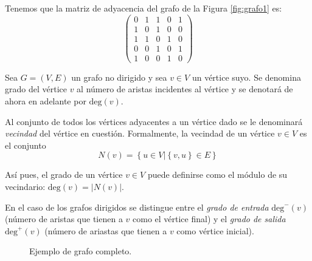 \begin{exampleth}
Tenemos que la matriz de adyacencia del grafo de la Figura \ref{fig:grafo1} es:
\begin{equation}
\begin{pmatrix}
0 & 1 & 1 & 0 & 1\\
1 & 0 & 1 & 0 & 0\\
1 & 1 & 0 & 1 & 0\\
0 & 0 & 1 & 0 & 1\\
1 & 0 & 0 & 1 & 0
\end{pmatrix}
\end{equation}
\end{exampleth}

\begin{definition}
Sea $G=(V,E)$ un grafo no dirigido y sea $v \in V$ un vértice suyo. Se denomina grado del vértice $v$ al número de aristas incidentes al vértice y se denotará de ahora en adelante por $\text{deg}(v)$.

Al conjunto de todos los vértices adyacentes a un vértice dado se le denominará \emph{vecindad} del vértice en cuestión. Formalmente, la vecindad de un vértice $v \in V$ es el conjunto
\begin{equation}
N(v) = \left\lbrace u \in V | \left\lbrace v,u\right\rbrace \in E \right\rbrace
\end{equation}

Así pues, el grado de un vértice $v \in V$ puede definirse como el módulo de su vecindario: $\text{deg}(v) = |N(v)|$.

En el caso de los grafos dirigidos se distingue entre el \emph{grado de entrada} $\text{deg}^-(v)$ (número de aristas que tienen a $v$ como el vértice final) y el \emph{grado de salida} $\text{deg}^+(v)$ (número de ariastas que tienen a $v$ como vértice inicial). 
\end{definition}


\begin{wrapfigure}{r}{0.4\textwidth}
\caption{Ejemplo de grafo completo.}
	\label{fig:grafo5}
\end{wrapfigure}

